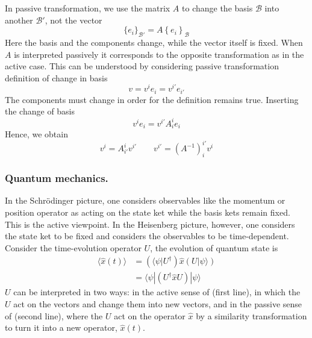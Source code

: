 \documentclass[../../../main.tex]{subfiles}
\begin{document}
In passive transformation, we use the matrix $A$ to change the basis $\mathcal{B}$ into another $\mathcal{B}'$, not the vector
\begin{equation*}
  \{e_i\}_{\mathcal{B}'} = A \left\{ e_i \right\} _{\mathcal{B}}
\end{equation*}
Here the basis and the components change, while the vector itself is fixed.
When $A$ is interpreted passively it corresponds to the opposite transformation as in the active case.
This can be understood by considering passive transformation definition of change in basis
\begin{equation*}
  v = v^{i} e_{i} = v^{i'} e_{i'}
\end{equation*}
The components must change in order for the definition remains true.
Inserting the change of basis
\begin{equation*}
  v^{i} e_{i} = v^{i'} A_{i}^{i} e_{i}
\end{equation*}
Hence, we obtain
\begin{equation*}
  v^{i} = A_{i'}^{i} v^{i'}\qquad
  v^{i'} = (A^{-1})_{i}^{i'} v^{i}
\end{equation*}

\subsubsection{Quantum mechanics.}
In the Schrödinger picture, one considers observables like the momentum or position operator as acting on the state ket while the basis kets remain fixed.
This is the active viewpoint.
In the Heisenberg picture, however, one considers the state ket to be fixed and considers the observables to be time-dependent.
Consider the time-evolution operator $U$, the evolution of quantum state is
\begin{align*}
  \langle \hat{x}(t) \rangle
   & =  \left(\langle \psi | U^{\dagger}\right) \hat{x} \left(U | \psi \rangle\right) \\
   & =  \langle \psi | (U^{\dagger} \hat{x} U) | \psi \rangle
\end{align*}
$U$ can be interpreted in two ways: in the active sense of (first line), in which the $U$ act on the vectors and change them into new vectors, and in the passive sense of (second line), where the $U$ act on the operator $\hat{x}$ by a similarity transformation to turn it into a new operator, $\hat{x}(t)$.
\end{document}
